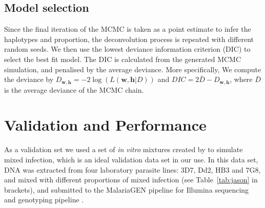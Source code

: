 \documentclass{bioinfo}
\begin{document}
\subsection{Model selection}\label{sec:method.dic}
Since the final iteration of the MCMC is taken as a point estimate to infer the haplotypes and proportion, the deconvolution process is repeated with different random seeds. We then use the lowest deviance information criterion (DIC) to select the best fit model. The DIC is calculated from the generated MCMC simulation, and penalised by the average deviance. More specifically, We compute the deviance by $ D_{\mathbf{w}, \mathbf{h}} = -2 \log( L (\mathbf{w}, \mathbf{h}|D) )$ and $DIC = 2\bar{D} - D_{\mathbf{w}, \mathbf{h}}$, where $\bar{D}$ is the average deviance of the MCMC chain. %



\section{Validation and Performance}
As a validation set we used a set of {\it in vitro} mixtures created by \citet{Wendler2015} to simulate mixed infection, which is an ideal validation data set in our use. In this data set, DNA was extracted from four laboratory parasite lines: 3D7, Dd2, HB3 and 7G8, and mixed with different proportions of mixed infection (see Table~\ref{tab:jason} in brackets), and submitted to the MalariaGEN pipeline \citep{MalariaGen2008} for Illumina sequencing and genotyping pipeline \citep{Menske2012}.
\end{document}
